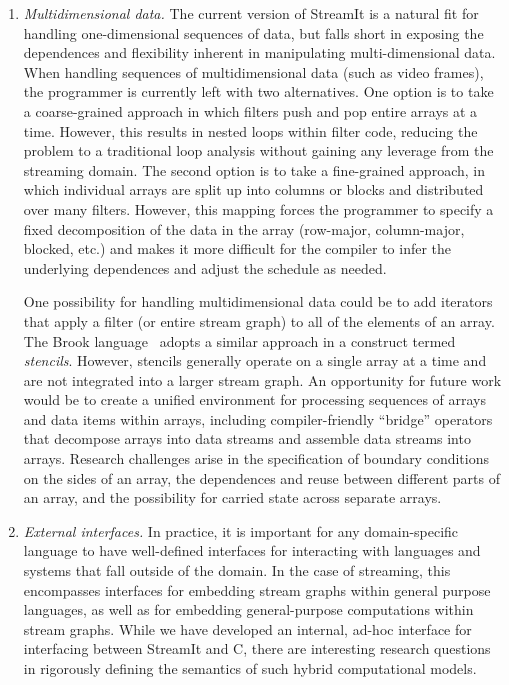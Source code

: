 \begin{enumerate}
\item {\it Multidimensional data.}  The current version of StreamIt is
  a natural fit for handling one-dimensional sequences of data, but
  falls short in exposing the dependences and flexibility inherent in
  manipulating multi-dimensional data.  When handling sequences of
  multidimensional data (such as video frames), the programmer is
  currently left with two alternatives.  One option is to take a
  coarse-grained approach in which filters push and pop entire arrays
  at a time.  However, this results in nested loops within filter
  code, reducing the problem to a traditional loop analysis without
  gaining any leverage from the streaming domain.  The second option
  is to take a fine-grained approach, in which individual arrays are
  split up into columns or blocks and distributed over many filters.
  However, this mapping forces the programmer to specify a fixed
  decomposition of the data in the array (row-major, column-major,
  blocked, etc.) and makes it more difficult for the compiler to infer
  the underlying dependences and adjust the schedule as needed.

  One possibility for handling multidimensional data could be to add
  iterators that apply a filter (or entire stream graph) to all of the
  elements of an array.  The Brook language~\cite{brook04} adopts a
  similar approach in a construct termed {\it stencils}.  However,
  stencils generally operate on a single array at a time and are not
  integrated into a larger stream graph.  An opportunity for future
  work would be to create a unified environment for processing
  sequences of arrays and data items within arrays, including
  compiler-friendly ``bridge'' operators that decompose arrays into
  data streams and assemble data streams into arrays.  Research
  challenges arise in the specification of boundary conditions on the
  sides of an array, the dependences and reuse between different parts
  of an array, and the possibility for carried state across separate
  arrays.

\item {\it External interfaces.}  In practice, it is important for any
  domain-specific language to have well-defined interfaces for
  interacting with languages and systems that fall outside of the
  domain.  In the case of streaming, this encompasses interfaces for
  embedding stream graphs within general purpose languages, as well as
  for embedding general-purpose computations within stream graphs.
  While we have developed an internal, ad-hoc interface for
  interfacing between StreamIt and C, there are interesting research
  questions in rigorously defining the semantics of such hybrid
  computational models. 


\end{enumerate}
